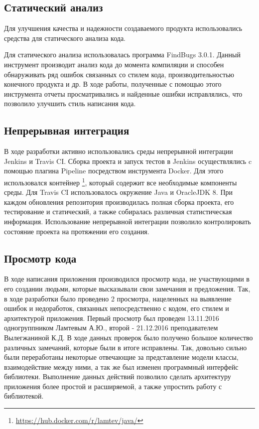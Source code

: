 \subsection{Статический анализ}

Для улучшения качества и надежности создаваемого продукта использовались средства для статического анализа кода.

Для статического анализа использовалась программа FindBugs 3.0.1. Данный инструмент производит анализ кода до момента компиляции и способен обнаруживать ряд ошибок связанных со стилем кода, производительностью конечного продукта и др. В ходе работы, полученные с помощью этого инструмента отчеты просматривались и найденные ошибки исправлялись, что позволило улучшить стиль написания кода.

\subsection{Непрерывная интеграция}

В ходе разработки активно использовались среды непрерывной интеграции Jenkins и Travis CI. Сборка проекта и запуск тестов в Jenkins осуществлялись c помощью плагина Pipeline посредством инструмента Docker. Для этого использовался контейнер \footnote{\url{https://hub.docker.com/r/lamtev/java/}}, который содержит все необходимые компоненты среды. Для Travis CI использовалось окружение Java и OracleJDK 8. При каждом обновления репозитория производилась полная сборка проекта, его тестирование и статический, а также собиралась различная статистическая информация. Использование непрерывной интеграции позволило контролировать состояние проекта на протяжении его создания.  
\subsection{Просмотр кода}

В ходе написания приложения производился просмотр кода, не участвующими в его создании людьми, которые высказывали свои замечания и предложения. Так, в ходе разработки было проведено 2 просмотра, нацеленных на выявление ошибок и недоработок, связанных  непосредственно с кодом, его стилем и архитектурой приложения. Первый просмотр был проведен 13.11.2016 одногруппником Ламтевым А.Ю., второй - 21.12.2016 преподавателем Вылегжаниной К.Д. В ходе данных проверок было получено большое количество различных замечаний, которые были в итоге исправлены. Так, довольно сильно были переработаны некоторые отвечающие за представление модели классы, взаимодействие между ними, а так же был изменен программный интерфейс библиотеки. Выполнение данных действий позволило сделать архитектуру приложения более простой и расширяемой, а также упростить работу с библиотекой.

